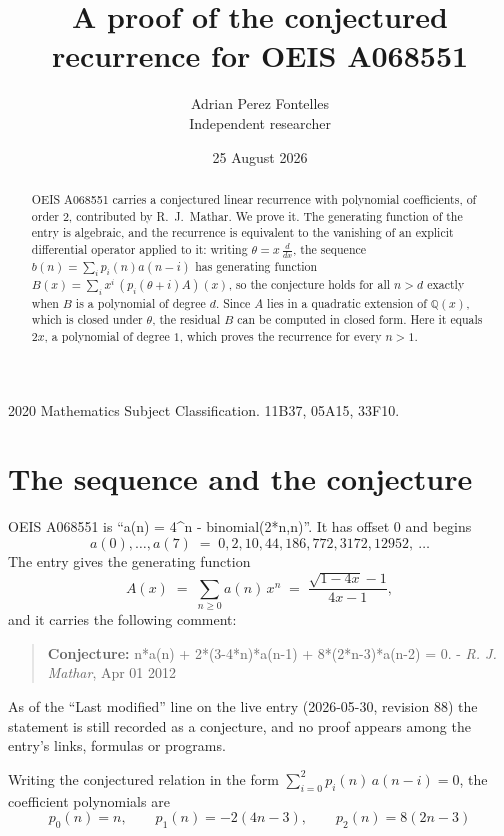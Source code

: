\documentclass[11pt,a4paper]{article}
\title{A proof of the conjectured recurrence for OEIS A068551}
\author{Adrian Perez Fontelles\\ \small Independent researcher}
\date{25 August 2026}
\theoremstyle{plain}
\theoremstyle{definition}
\begin{document}
\maketitle

\begin{abstract}
OEIS A068551 carries a conjectured linear recurrence with polynomial coefficients, of
order 2, contributed by R.~J.~Mathar. We prove it. The generating function of the
entry is algebraic, and the recurrence is equivalent to the vanishing of an explicit
differential operator applied to it: writing $\theta=x\,\frac{d}{dx}$, the sequence
$b(n)=\sum_{i}p_{i}(n)a(n-i)$ has generating function
$B(x)=\sum_{i}x^{i}\,(p_{i}(\theta+i)A)(x)$, so the conjecture holds for all $n>d$ exactly
when $B$ is a polynomial of degree $d$. Since $A$ lies in a quadratic extension of
$\mathbb{Q}(x)$, which is closed under $\theta$, the residual $B$ can be computed in
closed form. Here it equals $2 x$, a polynomial of degree $1$, which proves
the recurrence for every $n>1$.
\end{abstract}

\noindent\small 2020 Mathematics Subject Classification. 11B37, 05A15, 33F10.\normalsize

\section{The sequence and the conjecture}

OEIS A068551 is ``a(n) = 4\^{}n - binomial(2*n,n)''. It has offset $0$ and begins
\[
a(0),\dots,a(7)\;=\;0, 2, 10, 44, 186, 772, 3172, 12952,\ \dots
\]
The entry gives the generating function
\begin{equation}\label{eq:gf}
A(x)\;=\;\sum_{n\ge 0} a(n)\,x^{n}\;=\;\frac{\sqrt{1 - 4 x} - 1}{4 x - 1} ,
\end{equation}
and it carries the following comment:
\begin{quote}\small
\textbf{Conjecture:} n*a(n) + 2*(3-4*n)*a(n-1) + 8*(2*n-3)*a(n-2) = 0. - \emph{R. J. Mathar}, Apr 01 2012
\end{quote}
As of the ``Last modified'' line on the live entry (2026-05-30, revision 88) the
statement is still recorded as a conjecture, and no proof appears among the entry's links,
formulas or programs.

Writing the conjectured relation in the form $\sum_{i=0}^{2}p_{i}(n)\,a(n-i)=0$,
the coefficient polynomials are
\[
p_{0}(n)=n,\qquad p_{1}(n)=- 2 \left(4 n - 3\right),\qquad p_{2}(n)=8 \left(2 n - 3\right)
\]
\end{document}
